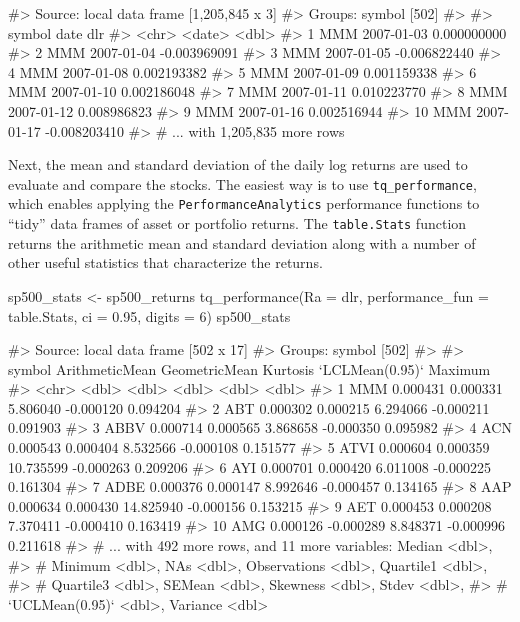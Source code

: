 \begin{Schunk}
\begin{Soutput}
#> Source: local data frame [1,205,845 x 3]
#> Groups: symbol [502]
#> 
#>    symbol       date          dlr
#>     <chr>     <date>        <dbl>
#> 1     MMM 2007-01-03  0.000000000
#> 2     MMM 2007-01-04 -0.003969091
#> 3     MMM 2007-01-05 -0.006822440
#> 4     MMM 2007-01-08  0.002193382
#> 5     MMM 2007-01-09  0.001159338
#> 6     MMM 2007-01-10  0.002186048
#> 7     MMM 2007-01-11  0.010223770
#> 8     MMM 2007-01-12  0.008986823
#> 9     MMM 2007-01-16  0.002516944
#> 10    MMM 2007-01-17 -0.008203410
#> # ... with 1,205,835 more rows
\end{Soutput}
\end{Schunk}

Next, the mean and standard deviation of the daily log returns are used
to evaluate and compare the stocks. The easiest way is to use
\texttt{tq\_performance}, which enables applying the
\texttt{PerformanceAnalytics} performance functions to ``tidy'' data
frames of asset or portfolio returns. The \texttt{table.Stats} function
returns the arithmetic mean and standard deviation along with a number
of other useful statistics that characterize the returns.

\begin{Schunk}
\begin{Sinput}
sp500_stats <- sp500_returns %
    tq_performance(Ra = dlr, performance_fun = table.Stats, ci = 0.95, digits = 6) 
sp500_stats
\end{Sinput}
\end{Schunk}

\begin{Schunk}
\begin{Soutput}
#> Source: local data frame [502 x 17]
#> Groups: symbol [502]
#> 
#>    symbol ArithmeticMean GeometricMean  Kurtosis `LCLMean(0.95)`  Maximum
#>     <chr>          <dbl>         <dbl>     <dbl>           <dbl>    <dbl>
#> 1     MMM       0.000431      0.000331  5.806040       -0.000120 0.094204
#> 2     ABT       0.000302      0.000215  6.294066       -0.000211 0.091903
#> 3    ABBV       0.000714      0.000565  3.868658       -0.000350 0.095982
#> 4     ACN       0.000543      0.000404  8.532566       -0.000108 0.151577
#> 5    ATVI       0.000604      0.000359 10.735599       -0.000263 0.209206
#> 6     AYI       0.000701      0.000420  6.011008       -0.000225 0.161304
#> 7    ADBE       0.000376      0.000147  8.992646       -0.000457 0.134165
#> 8     AAP       0.000634      0.000430 14.825940       -0.000156 0.153215
#> 9     AET       0.000453      0.000208  7.370411       -0.000410 0.163419
#> 10    AMG       0.000126     -0.000289  8.848371       -0.000996 0.211618
#> # ... with 492 more rows, and 11 more variables: Median <dbl>,
#> #   Minimum <dbl>, NAs <dbl>, Observations <dbl>, Quartile1 <dbl>,
#> #   Quartile3 <dbl>, SEMean <dbl>, Skewness <dbl>, Stdev <dbl>,
#> #   `UCLMean(0.95)` <dbl>, Variance <dbl>
\end{Soutput}
\end{Schunk}

